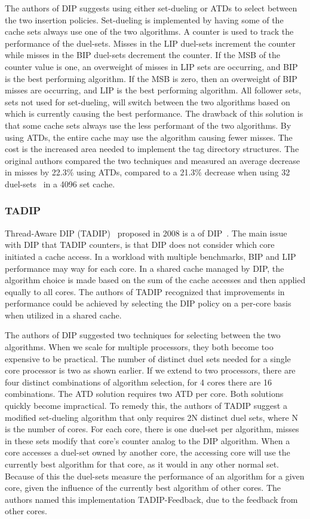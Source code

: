 The authors of DIP suggests using either set-dueling or ATDs to select between the two insertion policies.
Set-dueling is implemented by having some of the cache sets always use one of the two algorithms.
A counter is used to track the performance of the duel-sets.
Misses in the LIP duel-sets increment the counter while misses in the BIP duel-sets decrement the counter.
If the MSB of the counter value is one, an overweight of misses in LIP sets are occurring, and BIP is the best performing algorithm. 
If the MSB is zero, then an overweight of BIP misses are occurring, and LIP is the best performing algorithm.
All follower sets, sets not used for set-dueling, will switch between the two algorithms based on which is currently causing the best performance.
The drawback of this solution is that some cache sets always use the less performant of the two algorithms.
By using ATDs, the entire cache may use the algorithm causing fewer misses.
The cost is the increased area needed to implement the tag directory structures.
The original authors compared the two techniques and measured an average decrease in misses by 22.3\% using ATDs, compared to a 21.3\% decrease when using 32 duel-sets~\cite{Qureshi2007} in a 4096 set cache.

\subsubsection{TADIP}
Thread-Aware DIP (TADIP)~\cite{Jaleel2008} proposed in 2008 is a of DIP~\cite{Qureshi2007}.
The main issue with DIP that TADIP counters, is that DIP does not consider which core initiated a cache access.
In a workload with multiple benchmarks, BIP and LIP performance may way for each core.
In a shared cache managed by DIP, the algorithm choice is made based on the sum of the cache accesses and then applied equally to all cores.
The authors of TADIP recognized that improvements in performance could be achieved by selecting the DIP policy on a per-core basis when utilized in a shared cache.

The authors of DIP suggested two techniques for selecting between the two algorithms. 
When we scale for multiple processors, they both become too expensive to be practical.
The number of distinct duel sets needed for a single core processor is two as shown earlier.
If we extend to two processors, there are four distinct combinations of algorithm selection, for 4 cores there are 16 combinations.
The ATD solution requires two ATD per core.
Both solutions quickly become impractical.
To remedy this, the authors of TADIP suggest a modified set-dueling algorithm that only requires 2N distinct duel sets, where N is the number of cores.
For each core, there is one duel-set per algorithm, misses in these sets modify that core's counter analog to the DIP algorithm.
When a core accesses a duel-set owned by another core, the accessing core will use the currently best algorithm for that core, as it would in any other normal set.
Because of this the duel-sets measure the performance of an algorithm for a given core, given the influence of the currently best algorithm of other cores.
The authors named this implementation TADIP-Feedback, due to the feedback from other cores.

